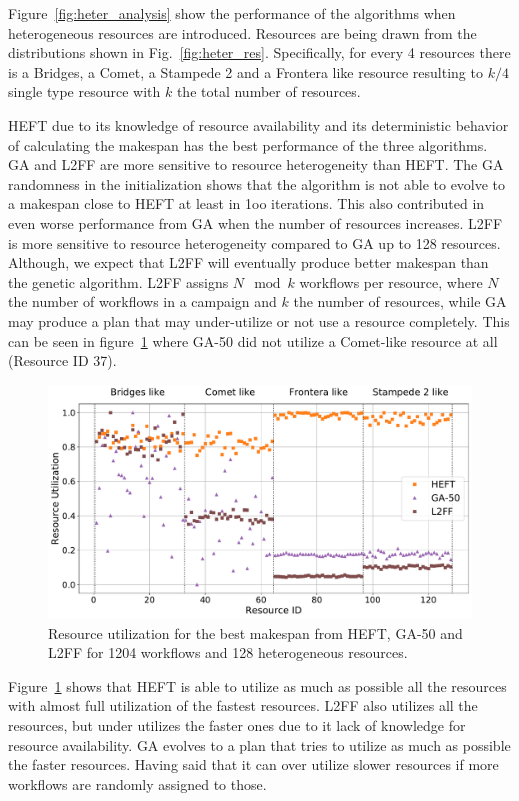 Figure~\ref{fig:heter_analysis} show the performance of the algorithms when heterogeneous resources are introduced.
Resources are being drawn from the distributions shown in Fig.~\ref{fig:heter_res}.
Specifically, for every 4 resources there is a Bridges, a Comet, a Stampede 2 and a Frontera like resource resulting to $k / 4$ single type resource with $k$ the total number of resources.

HEFT due to its knowledge of  resource availability and its deterministic behavior of calculating the makespan has the best performance of the three algorithms.
GA and L2FF are more sensitive to resource heterogeneity than HEFT.
The GA randomness in the initialization shows that the algorithm is not able to evolve to a makespan close to HEFT at least in 1oo iterations.
This also contributed in even worse performance from GA when the number of resources increases.
L2FF is more sensitive to resource heterogeneity compared to GA up to 128 resources. 
Although, we expect that L2FF will eventually produce better makespan than the genetic algorithm.
L2FF assigns $N \mod k$ workflows per resource, where $N$ the number of workflows in a campaign and $k$ the number of resources, while GA may produce a plan that may under-utilize or not use a resource completely.
This can be seen in figure~\ref{fig:res_util} where GA-50 did not utilize a Comet-like resource at all (Resource ID 37).

\begin{figure}[ht!]
    \centering
    \includegraphics[width=.95\textwidth]{figures/campaign/HeteroResources_StHeteroCampaigns_Utils.pdf}
    \caption{Resource utilization for the best makespan from HEFT, GA-50 and L2FF for 1204 workflows and 128 heterogeneous resources.}
    \label{fig:res_util}
\end{figure}

Figure~\ref{fig:res_util} shows that HEFT is able to utilize as much as possible all the resources with almost full utilization of the fastest resources.
L2FF also utilizes all the resources, but under utilizes the faster ones due to it lack of knowledge for resource availability.
GA evolves to a plan that tries to utilize as much as possible the faster resources.
Having said that it can over utilize slower resources if more workflows are randomly assigned to those.


